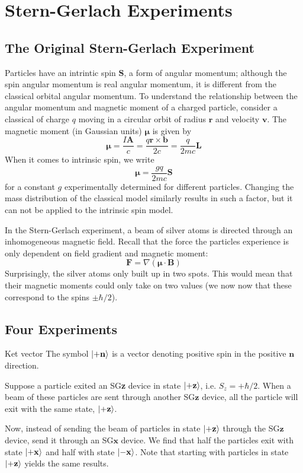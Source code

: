 \documentclass{report}
\newcommand{\dfn}[2]{\begin{Definition}[colbacktitle=red!75!black]{#1}{}#2\end{Definition}}
\newcommand{\bs}[1]{\boldsymbol{#1}}
\begin{document}
\chapter{Stern-Gerlach Experiments}
\section{The Original Stern-Gerlach Experiment}

Particles have an intrintic spin $\mathbf{S}$, a form of angular momentum; although the spin angular momentum is real angular momentum, it is different from the classical orbital angular momentum. To understand the relationship between the angular momentum and magnetic moment of a charged particle, consider a classical of charge $q$ moving in a circular orbit of radius $\mathbf r$ and velocity $\mathbf v$. The magnetic moment (in Gaussian units)  $\bs{\mu}$ is given by
\[
	\boldsymbol{\mu} = \frac{I \mathbf A}{c} = \frac{q\mathbf r \times \mathbf b}{2c} = \frac{q}{2mc} \mathbf L
\] 
When it comes to intrinsic spin, we write
\[
	\bs{\mu} = \frac{gq}{2mc} \mathbf S
\] 
for a constant \(g\) experimentally determined for different particles. Changing the mass distribution of the classical model similarly results in such a factor, but it can not be applied to the intrinsic spin model. 

In the Stern-Gerlach experiment, a beam of silver atoms is directed through an inhomogeneous magnetic field. Recall that the force the particles experience is only dependent on field gradient and magnetic moment:
\[
\mathbf F = \nabla (\bs{\mu} \cdot \mathbf B) 
\] 
Surprisingly, the silver atoms only built up in two spots. This would mean that their magnetic moments could only take on two values (we now now that these correspond to the spins \(\pm \hbar/2\)).  

\section{Four Experiments}

\dfn{Ket vector}{
The symbol \(\ket{+\mathbf n}\) is a vector denoting positive spin in the positive \(\mathbf n\) direction. }
Suppose a particle exited an SG\textbf z device in state \(\ket{+ \mathbf z}\), i.e. \(S_z = + \hbar /2\). When a beam of these particles are sent through another SG\(\mathbf z\) device, all the particle will exit with the same state, \(\ket{+ \mathbf z}\).

Now, instead of sending the beam of particles in state \(\ket{+\mathbf z}\) through the SG\(\mathbf z\) device, send it through an SG\(\mathbf x\) device. We find that half the particles exit with state \(\ket{+ \mathbf x}\) and half with state \(\ket{- \mathbf x}\). Note that starting with particles in state \(\ket{+ \mathbf z}\) yields the same results. 
\end{document}
